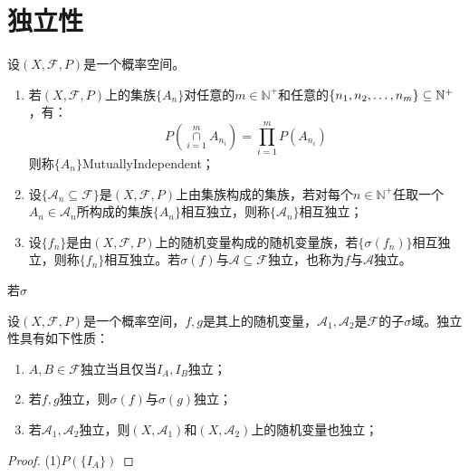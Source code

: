 \section{独立性}
\begin{definition}
	设$(X,\mathscr{F},P)$是一个概率空间。
	\begin{enumerate}
		\item 若$(X,\mathscr{F},P)$上的集族$\{A_n\}$对任意的$m\in\mathbb{N}^+$和任意的$\{n_1, n_2, \dots, n_{m}\}\subseteq\mathbb{N}^+$，有：
		\begin{equation*}
			P\left(\underset{i=1}{\overset{m}{\cap}}A_{n_i}\right)=\prod_{i=1}^{m}P(A_{n_i})
		\end{equation*}
		则称$\{A_n\}$\gls{MutuallyIndependent}；
		\item 设$\{\mathscr{A}_n\subseteq\mathscr{F}\}$是$(X,\mathscr{F},P)$上由集族构成的集族，若对每个$n\in\mathbb{N}^+$任取一个$A_n\in\mathscr{A}_n$所构成的集族$\{A_n\}$相互独立，则称$\{\mathscr{A}_n\}$相互独立；
		\item 设$\{f_n\}$是由$(X,\mathscr{F},P)$上的随机变量构成的随机变量族，若$\{\sigma(f_n)\}$相互独立，则称$\{f_n\}$相互独立。若$\sigma(f)$与$\mathscr{A}\subseteq\mathscr{F}$独立，也称为$f$与$\mathscr{A}$独立。
	\end{enumerate}
	若$\sigma	$
\end{definition}
\begin{property}\label{prop:Independent}
	设$(X,\mathscr{F},P)$是一个概率空间，$f,g$是其上的随机变量，$\mathscr{A}_1,\mathscr{A}_2$是$\mathscr{F}$的子$\sigma$域。独立性具有如下性质：
	\begin{enumerate}
		\item $A,B\in\mathscr{F}$独立当且仅当$I_A,I_B$独立；
		\item 若$f,g$独立，则$\sigma(f)$与$\sigma(g)$独立；
		\item 若$\mathscr{A}_1,\mathscr{A}_2$独立，则$(X,\mathscr{A}_1)$和$(X,\mathscr{A}_2)$上的随机变量也独立；
	\end{enumerate}
\end{property}
\begin{proof}
	(1)$P(\{I_A\})$
\end{proof}










